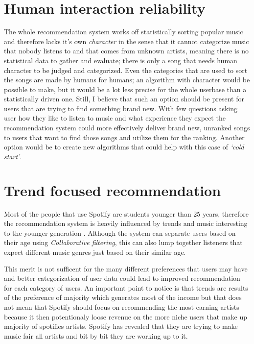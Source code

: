 \documentclass[10pt,twoside,slovak,a4paper]{article}
\begin{document}
\section{Human interaction reliability}
The whole recommendation system works off statistically sorting popular music and therefore lacks it's own \textit{character} in the sense that it cannot categorize music that nobody listens to and that comes from unknown artists, meaning there is no statistical data to gather and evaluate; there is only a song that needs human character to be judged and categorized. Even the categories that are used to sort the songs are made by humans for humans; an algorithm with character would be possible to make, but it would be a lot less precise for the whole userbase than a statistically driven one. Still, I believe that such an option should be present for users that are trying to find something brand new. With few questions asking user how they like to listen to music and what experience they expect the recommendation system could more effectively deliver brand new, unranked songs to users that want to find those songs and utilize them for the ranking. Another option would be to create new algorithms that could help with this case of \textit{`cold start'}.

\section{Trend focused recommendation}\label{trends}
Most of the people that use Spotify are students younger than 25 years\cite{bjorklund2022exploratory}, therefore the recommendation system is heavily influenced by trends and music interesting to the younger generation \cite{christiana2021hyperpop}. Although the system can separate users based on their age using \textit{Collaborative filtering}, this can also lump together listeners that expect different music genres just based on their similar age.

This merit is not sufficent for the many different preferences that users may have and better categorization of user data could lead to improved recommendation for each category of users. An important point to notice is that trends are results of the preference of majority which generates most of the income but that does not mean that Spotify should focus on recommending the most earning artists because it then potentionaly loose revenue on the more niche users that make up majority of spotifies artists. Spotify has revealed that they are trying to make music fair all artists and bit by bit they are working up to it\cite{hodgson}.
\end{document}
